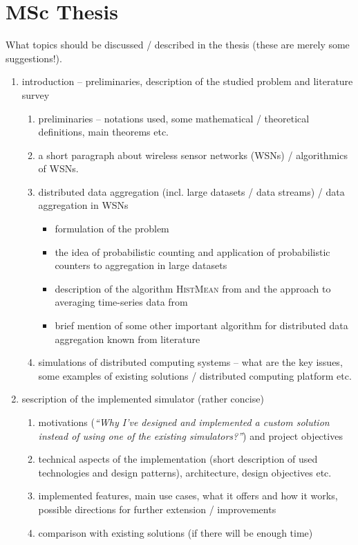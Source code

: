 \documentclass[a4paper, 12pt]{article}
\begin{document}
\section*{MSc Thesis}
What topics should be discussed / described in the thesis (these are merely some suggestions!).
\begin{enumerate}[label*=\arabic*.]
	\item introduction -- preliminaries, description of the studied problem and literature survey
		\begin{enumerate}[label*=\arabic*.]
			\item preliminaries -- notations used, some mathematical / theoretical definitions, main theorems etc.
			\item a short paragraph about wireless sensor networks (WSNs) / algorithmics of WSNs.
			\item distributed data aggregation (incl. large datasets / data streams) / data aggregation in WSNs
					\begin{itemize}
						\item formulation of the problem
						\item the idea of probabilistic counting and application of probabilistic counters to aggregation in large datasets
						\item description of the algorithm \textsc{HistMean} from \cite{JCi:2018:Histograms} and the approach
							  to averaging time-series data from \cite{Nugroho:2020:AveragingTS}
						\item brief mention of some other important algorithm for distributed data aggregation known from literature
					\end{itemize}
			\item simulations of distributed computing systems -- what are the key issues, some examples of existing solutions / distributed computing platform etc. 
		\end{enumerate}
	
	\item sescription of the implemented simulator (rather concise)
		\begin{enumerate}[label*=\arabic*.]
			\item motivations (\emph{``Why I've designed and implemented a custom solution instead of using one of the existing simulators?''}) and project objectives
			\item technical aspects of the implementation (short description of used technologies and design patterns), architecture, design objectives etc. 
			\item implemented features, main use cases, what it offers and how it works, possible directions for further extension / improvements
			\item comparison with existing solutions (if there will be enough time)
		\end{enumerate}
	

\end{enumerate}
\end{document}
